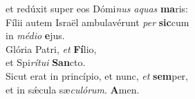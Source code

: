 \oddverse et redúxit super eos Dómi\textit{nus} \textit{a}\textit{quas} \textbf{ma}ris:\\
\evenverse Fílii autem Israël ambulavérunt \textit{per} \textbf{sic}cum~\*\\
\evenverse in \textit{mé}\textit{di}\textit{o} \textbf{e}jus.\\
\oddverse Glória Patri, \textit{et} \textbf{Fí}lio,~\*\\
\oddverse et Spi\textit{rí}\textit{tu}\textit{i} \textbf{San}cto.\\
\evenverse Sicut erat in princípio, et nunc, \textit{et} \textbf{sem}per,~\*\\
\evenverse et in sǽcula sæ\textit{cu}\textit{ló}\textit{rum}. \textbf{A}men.\\
